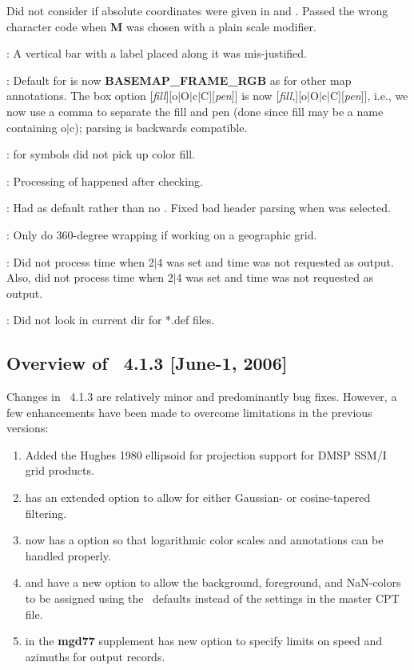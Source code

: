 \begin{description}
Did not consider if absolute coordinates were given in  and . Passed the wrong character code
when {\bf M} was chosen with a plain scale modifier.
\item [\GMTprog{psscale}]: A vertical bar with a label placed along it was mis-justified.
\item [\GMTprog{pstext}]: Default for  is now {\bf BASEMAP\_FRAME\_RGB} as for other map annotations.
The box option [{\it fill}][o$|$O$|$c$|$C][{\it pen}]] is now [{\it fill},][o$|$O$|$c$|$C][{\it pen}]], i.e., we now use
a comma to separate the fill and pen (done since fill may be a name containing o$|$c); parsing is backwards compatible.
\item [\GMTprog{psxyz}]:  for symbols did not pick up color fill.
\item [\GMTprog{trend2d}]: Processing of  happened after checking.
\item [\GMTprog{xyz2grd}]: Had  as default rather than no .  Fixed bad header parsing when  was selected.
\item [\GMTprog{dbase/grdraster}]: Only do 360-degree wrapping if working on a geographic grid.
\item [\GMTprog{mgd77/mgd77list}]: Did not process time when 2$|$4 was set and time was not requested as output.
Also, did not process time when 2$|$4 was set and time was not requested as output.
\item [\GMTprog{x2sys/x2sys}]: Did not look in current dir for *.def files.
\end{description}

\subsection{Overview of \gmt\ 4.1.3 [June-1, 2006]}

Changes in \GMT\ 4.1.3 are relatively minor and predominantly bug fixes.  However, a few enhancements
have been made to overcome limitations in the previous versions:

\begin{enumerate}
\item Added the Hughes 1980 ellipsoid for projection support for DMSP SSM/I grid products.
\item {} has an extended  option to allow for either Gaussian- or
cosine-tapered filtering.
\item {} now has a  option so that logarithmic color scales and annotations
can be handled properly.
\item {} and  have a new  option to allow the background, foreground, and
NaN-colors to be assigned using the \GMT\ defaults instead of the settings in the master CPT file. 
\item {} in the {\bf mgd77} supplement has new option  to specify limits on
speed and azimuths for output records.
\end{enumerate}

